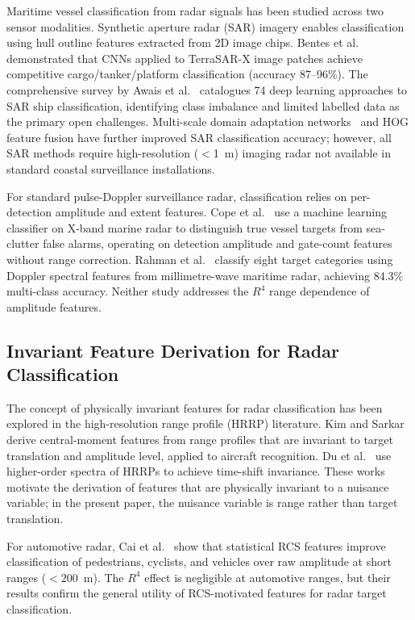 \documentclass[journal]{IEEEtran}
\begin{document}
Maritime vessel classification from radar signals has been studied across two sensor modalities. Synthetic aperture radar (SAR) imagery enables classification using hull outline features extracted from 2D image chips. Bentes et al.~\cite{bentes2017sar} demonstrated that CNNs applied to TerraSAR-X image patches achieve competitive cargo/tanker/platform classification (accuracy 87--96\%). The comprehensive survey by Awais et al.~\cite{awais2025survey} catalogues 74 deep learning approaches to SAR ship classification, identifying class imbalance and limited labelled data as the primary open challenges. Multi-scale domain adaptation networks~\cite{zhang2021hog} and HOG feature fusion have further improved SAR classification accuracy; however, all SAR methods require high-resolution ($<$1~m) imaging radar not available in standard coastal surveillance installations.

For standard pulse-Doppler surveillance radar, classification relies on per-detection amplitude and extent features. Cope et al.~\cite{cope2021tracking} use a machine learning classifier on X-band marine radar to distinguish true vessel targets from sea-clutter false alarms, operating on detection amplitude and gate-count features without range correction. Rahman et al.~\cite{rahman2023mmwave} classify eight target categories using Doppler spectral features from millimetre-wave maritime radar, achieving 84.3\% multi-class accuracy. Neither study addresses the $R^4$ range dependence of amplitude features.

\subsection{Invariant Feature Derivation for Radar Classification}

The concept of physically invariant features for radar classification has been explored in the high-resolution range profile (HRRP) literature. Kim and Sarkar~\cite{kim2002music} derive central-moment features from range profiles that are invariant to target translation and amplitude level, applied to aircraft recognition. Du et al.~\cite{du2005hrrp} use higher-order spectra of HRRPs to achieve time-shift invariance. These works motivate the derivation of features that are physically invariant to a nuisance variable; in the present paper, the nuisance variable is range rather than target translation.

For automotive radar, Cai et al.~\cite{cai2021mmwave} show that statistical RCS features improve classification of pedestrians, cyclists, and vehicles over raw amplitude at short ranges ($<$200~m). The $R^4$ effect is negligible at automotive ranges, but their results confirm the general utility of RCS-motivated features for radar target classification.
\end{document}
